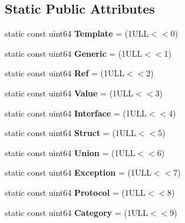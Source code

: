 \subsection*{Static Public Attributes}
\begin{DoxyCompactItemize}
\item 
\mbox{\label{class_entry_ae239a5ac21792686fed8a38e2dd49161}} 
static const uint64 {\bfseries Template} = (1\+U\+L\+L$<$$<$0)
\item 
\mbox{\label{class_entry_ae02e62d1c60a9a43bed5d691b5a048b8}} 
static const uint64 {\bfseries Generic} = (1\+U\+L\+L$<$$<$1)
\item 
\mbox{\label{class_entry_a530abd3056891add4d91ef6b26a55ca1}} 
static const uint64 {\bfseries Ref} = (1\+U\+L\+L$<$$<$2)
\item 
\mbox{\label{class_entry_aed8b4b067480b3b467f64363e390be17}} 
static const uint64 {\bfseries Value} = (1\+U\+L\+L$<$$<$3)
\item 
\mbox{\label{class_entry_ab880f63d6603f9ba28fcea37575ff7ce}} 
static const uint64 {\bfseries Interface} = (1\+U\+L\+L$<$$<$4)
\item 
\mbox{\label{class_entry_a62352fd788f44f3b34541092e3bee1a2}} 
static const uint64 {\bfseries Struct} = (1\+U\+L\+L$<$$<$5)
\item 
\mbox{\label{class_entry_a2954b31782155586b4d154cd8bcbaa86}} 
static const uint64 {\bfseries Union} = (1\+U\+L\+L$<$$<$6)
\item 
\mbox{\label{class_entry_af0d4d4eb70d52c24edeacf0fd339279e}} 
static const uint64 {\bfseries Exception} = (1\+U\+L\+L$<$$<$7)
\item 
\mbox{\label{class_entry_a3a84b60a59e7bc7cb2d1b71e3be16d80}} 
static const uint64 {\bfseries Protocol} = (1\+U\+L\+L$<$$<$8)
\item 
\mbox{\label{class_entry_aa6c8050991d37fb7c7f56f50399c75c2}} 
static const uint64 {\bfseries Category} = (1\+U\+L\+L$<$$<$9)
\item 

\end{DoxyCompactItemize}
